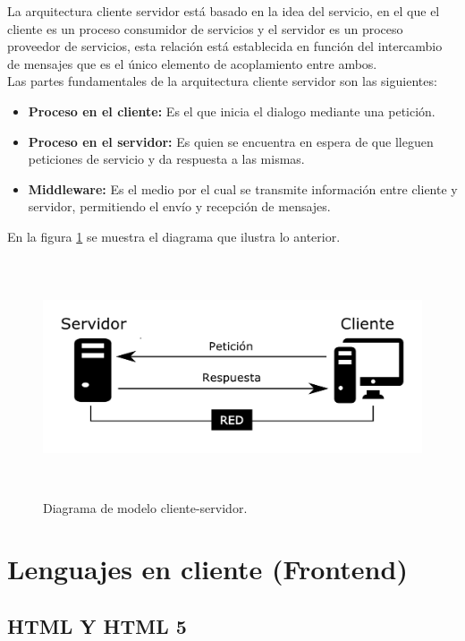La arquitectura cliente servidor est\'a basado en la idea del servicio, en el que el cliente es un proceso consumidor de servicios y el servidor es un proceso proveedor de servicios, esta relaci\'on est\'a establecida en funci\'on del intercambio de mensajes que es el \'unico elemento de acoplamiento entre ambos.\\

Las partes fundamentales de la arquitectura cliente servidor son las siguientes:

\begin{itemize}
	\item \textbf{Proceso en el cliente:} Es el que inicia el dialogo mediante una petici\'on.
	\item \textbf{Proceso en el servidor:} Es quien se encuentra en espera de que lleguen peticiones de servicio y da respuesta a las mismas.
	\item \textbf{Middleware:} Es el medio por el cual se transmite informaci\'on entre cliente y servidor, permitiendo el env\'io y recepci\'on de mensajes.
\end{itemize}

En la figura \ref{fig_clienteservidor} se muestra el diagrama que ilustra lo anterior.


	\begin{figure}[htb]
        \centering
        \includegraphics[width=16cm, height=7cm]{figuras/clienteservidor}
        \caption{Diagrama de modelo cliente-servidor.}
        \label{fig_clienteservidor}
    \end{figure}



\section{Lenguajes en cliente (Frontend)}
\subsection{HTML Y HTML 5}


